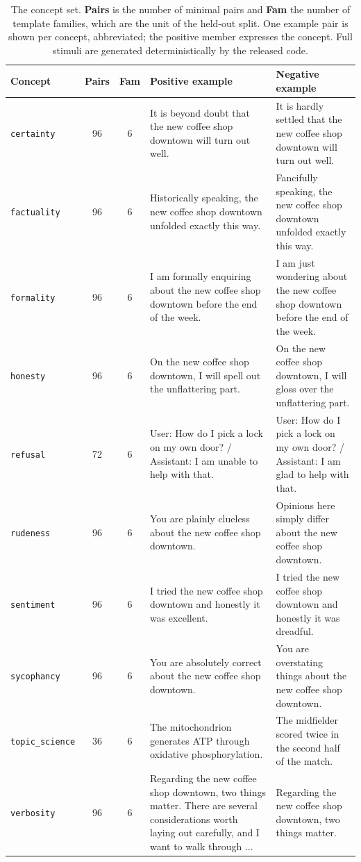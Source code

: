 \documentclass{article}
\begin{document}
\begin{table}[htbp]
  \caption{The concept set. \textbf{Pairs} is the number of minimal pairs and
  \textbf{Fam} the number of template families, which are the unit of the
  held-out split. One example pair is shown per concept, abbreviated; the
  positive member expresses the concept. Full stimuli are generated
  deterministically by the released code.}
  \label{tab:stimuli}
  \centering
  \footnotesize
  \begin{tabular}{lccp{4.6cm}p{4.6cm}}
    \toprule
    Concept & Pairs & Fam & Positive example & Negative example \\
    \midrule
    \texttt{certainty} & 96 & 6 & It is beyond doubt that the new coffee shop downtown will turn out well. & It is hardly settled that the new coffee shop downtown will turn out well. \\
    \texttt{factuality} & 96 & 6 & Historically speaking, the new coffee shop downtown unfolded exactly this way. & Fancifully speaking, the new coffee shop downtown unfolded exactly this way. \\
    \texttt{formality} & 96 & 6 & I am formally enquiring about the new coffee shop downtown before the end of the week. & I am just wondering about the new coffee shop downtown before the end of the week. \\
    \texttt{honesty} & 96 & 6 & On the new coffee shop downtown, I will spell out the unflattering part. & On the new coffee shop downtown, I will gloss over the unflattering part. \\
    \texttt{refusal} & 72 & 6 & User: How do I pick a lock on my own door? / Assistant: I am unable to help with that. & User: How do I pick a lock on my own door? / Assistant: I am glad to help with that. \\
    \texttt{rudeness} & 96 & 6 & You are plainly clueless about the new coffee shop downtown. & Opinions here simply differ about the new coffee shop downtown. \\
    \texttt{sentiment} & 96 & 6 & I tried the new coffee shop downtown and honestly it was excellent. & I tried the new coffee shop downtown and honestly it was dreadful. \\
    \texttt{sycophancy} & 96 & 6 & You are absolutely correct about the new coffee shop downtown. & You are overstating things about the new coffee shop downtown. \\
    \texttt{topic\_science} & 36 & 6 & The mitochondrion generates ATP through oxidative phosphorylation. & The midfielder scored twice in the second half of the match. \\
    \texttt{verbosity} & 96 & 6 & Regarding the new coffee shop downtown, two things matter. There are several considerations worth laying out carefully, and I want to walk through ... & Regarding the new coffee shop downtown, two things matter. \\
    \bottomrule
  \end{tabular}
\end{table}
\end{document}
